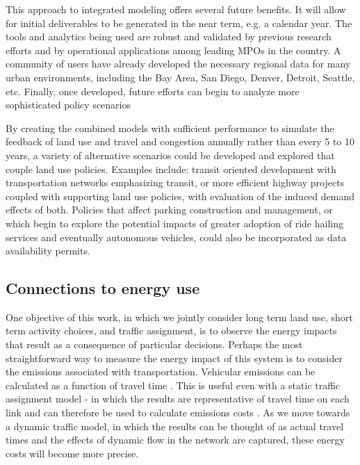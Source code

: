 This approach to integrated modeling offers several future benefits. It will allow for initial deliverables to be generated in the near term, e.g. a calendar year. The tools and analytics being used are robust and validated by previous research efforts and by operational applications among leading MPOs in the country. A community of users have already developed the necessary regional data for many urban environments, including the Bay Area, San Diego, Denver, Detroit, Seattle, etc. Finally, once developed, future efforts can begin to analyze more sophisticated policy scenarios

By creating the combined models with sufficient performance to simulate the feedback of land use and travel and congestion annually rather than every 5 to 10 years, a variety of alternative scenarios could be developed and explored that couple land use policies. Examples include: transit oriented development with transportation networks emphasizing transit, or more efficient highway projects coupled with supporting land use policies, with evaluation of the induced demand effects of both. Policies that affect parking construction and management, or which begin to explore the potential impacts of greater adoption of ride hailing services and eventually autonomous vehicles, could also be incorporated as data availability permits.

\subsection{Connections to energy use}
One objective of this work, in which we jointly consider long term land use, short term activity choices, and traffic assignment, is to observe the energy impacts that result as a consequence of particular decisions. Perhaps the most straightforward way to measure the energy impact of this system is to consider the emissions associated with transportation. Vehicular emissions can be calculated as a function of travel time \cite{ahn2008effects}. This is useful even with a static traffic assignment model - in which the results are representative of travel time on each link and can therefore be used to calculate emissions costs \cite{aziz2012integration}. As we move towards a dynamic traffic model, in which the results can be thought of as actual travel times and the effects of dynamic flow in the network are captured, these energy costs will become more precise.

